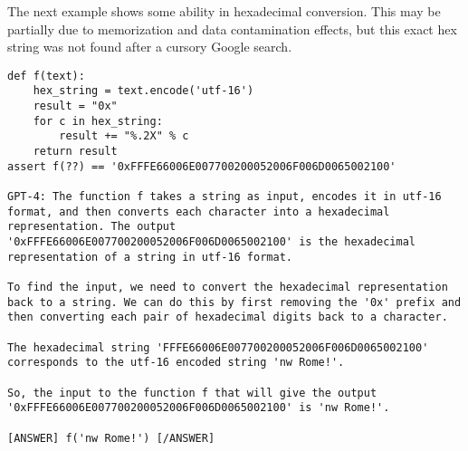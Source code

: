 The next example shows some ability in hexadecimal conversion. This may be partially due to memorization and data contamination effects, but this exact hex string was not found after a cursory Google search.

\begin{lstlisting}
def f(text):
    hex_string = text.encode('utf-16')
    result = "0x"
    for c in hex_string:
        result += "%.2X" % c
    return result
assert f(??) == '0xFFFE66006E007700200052006F006D0065002100'

GPT-4: The function f takes a string as input, encodes it in utf-16 format, and then converts each character into a hexadecimal representation. The output '0xFFFE66006E007700200052006F006D0065002100' is the hexadecimal representation of a string in utf-16 format.

To find the input, we need to convert the hexadecimal representation back to a string. We can do this by first removing the '0x' prefix and then converting each pair of hexadecimal digits back to a character.

The hexadecimal string 'FFFE66006E007700200052006F006D0065002100' corresponds to the utf-16 encoded string 'nw Rome!'. 

So, the input to the function f that will give the output '0xFFFE66006E007700200052006F006D0065002100' is 'nw Rome!'.

[ANSWER] f('nw Rome!') [/ANSWER]
\end{lstlisting}

